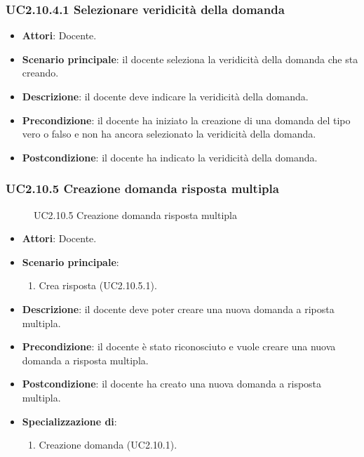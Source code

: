 \subsubsection{UC2.10.4.1 Selezionare veridicità della domanda}
\begin{itemize}
\item \textbf{Attori}: Docente.
\item \textbf{Scenario principale}: il docente seleziona la veridicità della domanda che sta creando.
\item \textbf{Descrizione}: il docente deve indicare la veridicità della domanda.
\item \textbf{Precondizione}: il docente ha iniziato la creazione di una domanda del tipo vero o falso e non ha ancora selezionato la veridicità della domanda.
\item \textbf{Postcondizione}: il docente ha indicato la veridicità della domanda.
\end{itemize}
\subsubsection{UC2.10.5 Creazione domanda risposta multipla}
\begin{figure}[H]
\centering
\noindent{}
\caption{UC2.10.5 Creazione domanda risposta multipla}
\end{figure}
\begin{itemize}
\item \textbf{Attori}: Docente.
\item \textbf{Scenario principale}:
\begin{enumerate}
\item Crea risposta (UC2.10.5.1).
\end{enumerate}
\item \textbf{Descrizione}: il docente deve poter creare una nuova domanda a riposta multipla.
\item \textbf{Precondizione}: il docente è stato riconosciuto e vuole creare una nuova domanda a risposta multipla.
\item \textbf{Postcondizione}: il docente ha creato una nuova domanda a risposta multipla.
\item \textbf{Specializzazione di}:
\begin{enumerate}
\item Creazione domanda (UC2.10.1).
\end{enumerate}
\end{itemize}
